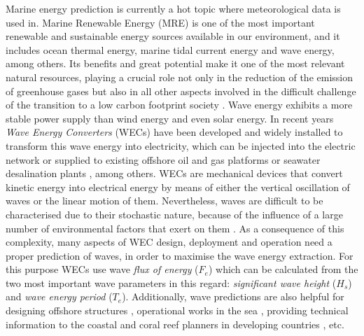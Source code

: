 \documentclass[review]{elsarticle}
\begin{document}
		Marine energy prediction is currently a hot topic where meteorological data is used in. Marine Renewable Energy (MRE) is one of the most important renewable and sustainable energy sources available in our environment, and it includes ocean thermal energy, marine tidal current energy and wave energy, among others. Its benefits and great potential \cite{ZEYRINGER20181281} make it one of the most relevant natural resources, playing a crucial role not only in the reduction of the emission of greenhouse gases but also in all other aspects involved in the difficult challenge of the transition to a low carbon footprint society \cite{BHATTACHARYA2017157, BREDE201344}. Wave energy exhibits a more stable power supply than wind energy and even solar energy. In recent years \textit{Wave Energy Converters} (WECs) \cite{FALCAO2010899} have been developed and widely installed to transform this wave energy into electricity, which can be injected into the electric network or supplied to existing offshore oil and gas platforms \cite{OLIVEIRAPINTO2019556} or seawater desalination plants \cite{FERNANDEZPRIETO2019546}, among others. WECs are mechanical devices that convert kinetic energy into electrical energy by means of either the vertical oscillation of waves or the linear motion of them. Nevertheless, waves are difficult to be characterised due to their stochastic nature, because of the influence of a large number of environmental factors that exert on them \cite{ochi1998}. As a consequence of this complexity, many aspects of WEC design, deployment and operation \cite{CROWLEY2018159, Abdelkhalik2016, 6898109} need a proper prediction of waves, in order to maximise the wave energy extraction. For this purpose WECs use wave \textit{flux of energy} ($F_e$) which can be calculated from the two most important wave parameters in this regard: \textit{significant wave height} ($H_s$) and \textit{wave energy period} ($T_e$). Additionally, wave predictions are also helpful for designing offshore structures \cite{CHATZIIOANNOU2017126}, operational works in the sea \cite{DALGIC2015211}, providing technical information to the coastal and coral reef planners in developing countries \cite{CALLAGHAN2018123}, etc.
\end{document}

